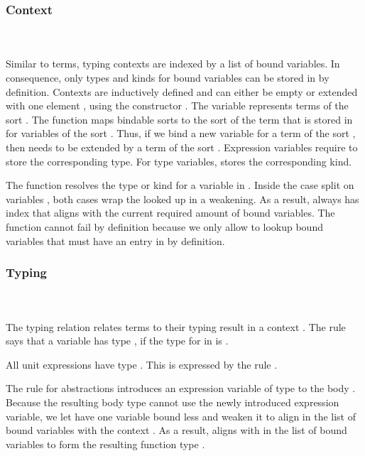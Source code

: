 \subsubsection{Context}\hfill\\\\
Similar to terms, typing contexts  are indexed by a list of bound variables.
In consequence, only types and kinds for bound variables can be stored in  by definition.
\FCtx
Contexts are inductively defined and can either be empty  or extended with one element , using the constructor   .
The variable  represents terms of the sort  . 
\noindent The function  maps bindable sorts  to the sort of the term that is stored in  for variables of the sort . Thus, if we bind a new variable for a term of the sort , then  needs to be extended by a term of the sort  .
\Fkind
Expression variables require  to store the corresponding type. 
For type variables,  stores the corresponding kind. 

\noindent The  function resolves the type or kind  for a variable  in .
\Flookup
Inside the case split on variables , both cases wrap the looked up  in a weakening. 
As a result,  always has index  that aligns with the current required amount of bound variables. 
The  function cannot fail by definition because we only allow to lookup bound variables that must have an entry in  by definition.

\subsubsection{Typing}\hfill\\\\
The typing relation    \Data{:}  relates terms  to their typing result  in a context .
\FTyping
The rule  says that a variable   has type , if the type for  in  is . 

\noindent All unit expressions  have type . This is expressed by the rule .

\noindent The rule for abstractions  introduces an expression variable of type  to the body . 
Because the resulting body type  cannot use the newly introduced expression variable, we let  have one variable bound less and weaken it to align in the list of bound variables with the context   . 
As a result,  aligns with  in the list of bound variables to form the resulting function type   . 

